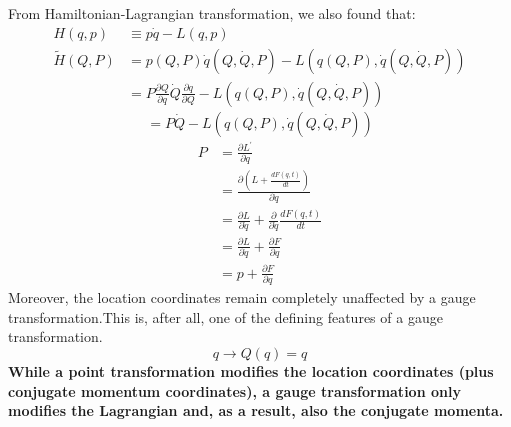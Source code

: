 From Hamiltonian-Lagrangian transformation, we also found that:
$$
\begin{aligned}
H(q, p) & \equiv p \dot{q}-L(q, p) \\
\tilde{H}(Q, P) &=p(Q, P) \dot{q}(Q, \dot{Q}, P)-L(q(Q, P), \dot{q}(Q, \dot{Q}, P)) \\
&=P \frac{\partial Q}{\partial q} \dot{Q} \frac{\partial q}{\partial Q}-L(q(Q, P), \dot{q}(Q, \dot{Q}, P))
\end{aligned}
$$
$$
=P \dot{Q}-L(q(Q, P), \dot{q}(Q, \dot{Q}, P))
$$
\begin{equation}
    \begin{aligned}
P &=\frac{\partial L^{\prime}}{\partial \dot{q}} \\
&=\frac{\partial\left(L+\frac{d F(q, t)}{d t}\right)}{\partial \dot{q}} \\
&=\frac{\partial L}{\partial \dot{q}}+\frac{\partial}{\partial \dot{q}} \frac{d F(q, t)}{d t} \\
&=\frac{\partial L}{\partial \dot{q}}+\frac{\partial F}{\partial q} \\
&=p+\frac{\partial F}{\partial q}
\end{aligned}
\label{canongauge1}
\end{equation}
Moreover, the location coordinates remain completely unaffected by a gauge transformation.This is, after all, one of the defining features of a gauge transformation. 
\begin{equation}
q \rightarrow Q(q)=q
\end{equation}
\textbf{While a point transformation modifies the location coordinates (plus conjugate momentum coordinates), a gauge transformation only modifies the Lagrangian and, as a result, also the conjugate momenta.}

